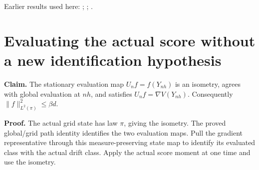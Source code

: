 \documentclass[11pt,a4paper]{article}
\begin{document}
Earlier results used here: \cite[Section~3.26.10]{LangevinLean2026ULASC}; \cite[Section~3.26.3]{LangevinLean2026ULASC}; \cite[Section~3.27.7]{LangevinLean2026ULASC}.

\section{\texorpdfstring{Evaluating the actual score without a new identification hypothesis}{Evaluating the actual score without a new identification hypothesis}}


\textbf{Claim.} The stationary evaluation map \(U_n f=f(Y_{nh})\) is an isometry, agrees with global evaluation at \(nh\), and satisfies \(U_nf=\nabla V(Y_{nh})\). Consequently \(\|f\|_{L^2(\pi)}^2\le\beta d\).



\textbf{Proof.} The actual grid state has law \(\pi\), giving the isometry. The proved global/\allowbreak{}grid path identity identifies the two evaluation maps. Pull the gradient representative through this measure-preserving state map to identify its evaluated class with the actual drift class. Apply the actual score moment at one time and use the isometry.
\end{document}

